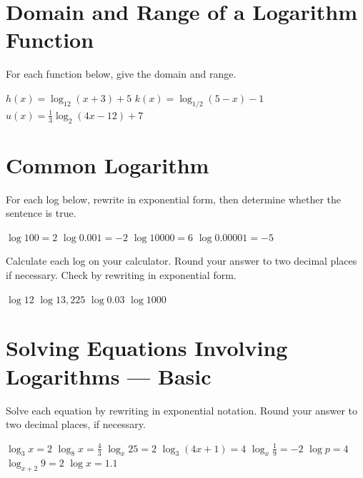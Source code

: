 \section*{Domain and Range of a Logarithm Function}
For each function below, give the domain and range.
\begin{smenum}
\mitemxxx
{$h(x)=\log_{12}(x+3)+5$}
{$k(x)=\log_{1/2}(5-x)-1$}
{$u(x)=\frac{1}{3}\log_{2}(4x-12)+7$}
\end{smenum}

\section*{Common Logarithm}
For each log below, rewrite in exponential form, then determine whether the sentence is true.
\begin{smenum}
\mitemxxxx
{$\log 100=2$}
{$\log 0.001=-2$}
{$\log 10000=6$}
{$\log 0.00001=-5$}
\end{smenum}
Calculate each log on your calculator. Round your answer to two decimal places if necessary. Check by rewriting in exponential form.
\begin{smenum}
\mitemxxxx
{$\log 12$}
{$\log 13,225$}
{$\log 0.03$}
{$\log 1000$}
\end{smenum}
%

\section*{Solving Equations Involving Logarithms --- Basic}
Solve each equation by rewriting in exponential notation.  Round your answer to two decimal places, if necessary.
\begin{smenum}
\mitemxxxx
{$\log_3 x=2$}
{$\log_8 x = \frac{4}{3}$}
{$\log_x 25 = 2$}
{$\log_3(4x+1)=4$}
\mitemxxxx
{$\log_x \frac{1}{9}=-2$}
{$\log p = 4$}
{$\log_{x+2} 9 = 2$}
{$\log x = 1.1$}
\end{smenum}

